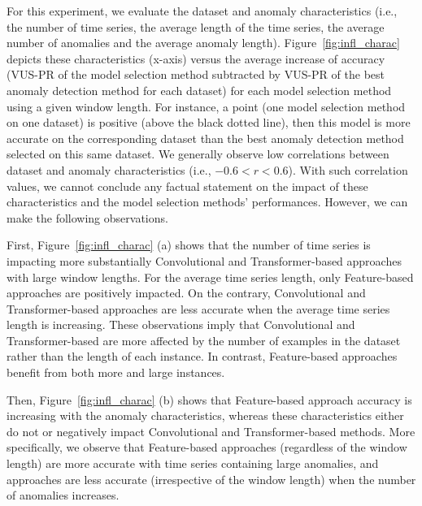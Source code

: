 For this experiment, we evaluate the dataset and anomaly characteristics (i.e., the number of time series, the average length of the time series, the average number of anomalies and the average anomaly length). Figure~\ref{fig:infl_charac} depicts these characteristics (x-axis) versus the average increase of accuracy (VUS-PR of the model selection method subtracted by VUS-PR of the best anomaly detection method for each dataset) for each model selection method using a given window length. 
For instance,  a point (one model selection method on one dataset) is positive (above the black dotted line), then this model is more accurate on the corresponding dataset than the best anomaly detection method selected on this same dataset. %
We generally observe low correlations between dataset and anomaly characteristics (i.e., $-0.6<r<0.6$). With such correlation values, we cannot conclude any factual statement on the impact of these characteristics and the model selection methods' performances. However, we can make the following observations.

First, Figure~\ref{fig:infl_charac} (a) shows that the number of time series is impacting more substantially Convolutional and Transformer-based approaches with large window lengths. For the average time series length, only Feature-based approaches are positively impacted. On the contrary, Convolutional and Transformer-based approaches are less accurate when the average time series length is increasing. These observations imply that Convolutional and Transformer-based are more affected by the number of examples in the dataset rather than the length of each instance. In contrast, Feature-based approaches benefit from both more and large instances.

Then, Figure~\ref{fig:infl_charac} (b) shows that Feature-based approach accuracy is increasing with the anomaly characteristics, whereas these characteristics either do not or negatively impact Convolutional and Transformer-based methods. More specifically, we observe that Feature-based approaches (regardless of the window length) are more accurate with time series containing large anomalies, and  approaches are less accurate (irrespective of the window length) when the number of anomalies increases.

